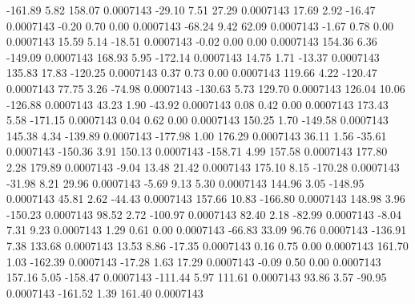      -161.89        5.82      158.07     0.0007143
      -29.10        7.51       27.29     0.0007143
       17.69        2.92      -16.47     0.0007143
       -0.20        0.70        0.00     0.0007143
      -68.24        9.42       62.09     0.0007143
       -1.67        0.78        0.00     0.0007143
       15.59        5.14      -18.51     0.0007143
       -0.02        0.00        0.00     0.0007143
      154.36        6.36     -149.09     0.0007143
      168.93        5.95     -172.14     0.0007143
       14.75        1.71      -13.37     0.0007143
      135.83       17.83     -120.25     0.0007143
        0.37        0.73        0.00     0.0007143
      119.66        4.22     -120.47     0.0007143
       77.75        3.26      -74.98     0.0007143
     -130.63        5.73      129.70     0.0007143
      126.04       10.06     -126.88     0.0007143
       43.23        1.90      -43.92     0.0007143
        0.08        0.42        0.00     0.0007143
      173.43        5.58     -171.15     0.0007143
        0.04        0.62        0.00     0.0007143
      150.25        1.70     -149.58     0.0007143
      145.38        4.34     -139.89     0.0007143
     -177.98        1.00      176.29     0.0007143
       36.11        1.56      -35.61     0.0007143
     -150.36        3.91      150.13     0.0007143
     -158.71        4.99      157.58     0.0007143
      177.80        2.28      179.89     0.0007143
       -9.04       13.48       21.42     0.0007143
      175.10        8.15     -170.28     0.0007143
      -31.98        8.21       29.96     0.0007143
       -5.69        9.13        5.30     0.0007143
      144.96        3.05     -148.95     0.0007143
       45.81        2.62      -44.43     0.0007143
      157.66       10.83     -166.80     0.0007143
      148.98        3.96     -150.23     0.0007143
       98.52        2.72     -100.97     0.0007143
       82.40        2.18      -82.99     0.0007143
       -8.04        7.31        9.23     0.0007143
        1.29        0.61        0.00     0.0007143
      -66.83       33.09       96.76     0.0007143
     -136.91        7.38      133.68     0.0007143
       13.53        8.86      -17.35     0.0007143
        0.16        0.75        0.00     0.0007143
      161.70        1.03     -162.39     0.0007143
      -17.28        1.63       17.29     0.0007143
       -0.09        0.50        0.00     0.0007143
      157.16        5.05     -158.47     0.0007143
     -111.44        5.97      111.61     0.0007143
       93.86        3.57      -90.95     0.0007143
     -161.52        1.39      161.40     0.0007143
